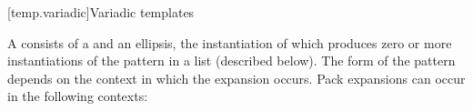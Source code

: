 \documentclass{wg21}
\begin{document}
\begin{itemize}
%
%
\end{itemize}
%

[temp.variadic]{Variadic templates}

\pnum
{}%
A 
consists of a  and an ellipsis, the instantiation of which
produces zero or more instantiations of the pattern in a list (described below).
The form of the pattern
depends on the context in which the expansion occurs. Pack
expansions can occur in the following contexts:
\end{document}
